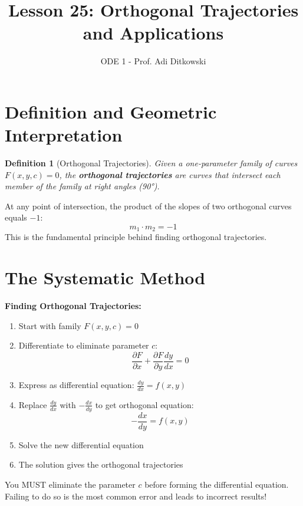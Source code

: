 \documentclass[12pt]{article}
\title{Lesson 25: Orthogonal Trajectories and Applications}
\author{ODE 1 - Prof. Adi Ditkowski}
\date{}
\newtheorem{definition}{Definition}
\begin{document}
\maketitle

\section{Definition and Geometric Interpretation}

\begin{definition}[Orthogonal Trajectories]
Given a one-parameter family of curves $F(x,y,c) = 0$, the \textbf{orthogonal trajectories} are curves that intersect each member of the family at right angles (90°).
\end{definition}

\begin{keypoint}
At any point of intersection, the product of the slopes of two orthogonal curves equals $-1$:
\[m_1 \cdot m_2 = -1\]
This is the fundamental principle behind finding orthogonal trajectories.
\end{keypoint}

\section{The Systematic Method}

\begin{algorithm}
\textbf{Finding Orthogonal Trajectories:}
\begin{enumerate}
    \item Start with family $F(x,y,c) = 0$
    \item Differentiate to eliminate parameter $c$:
    \[\frac{\partial F}{\partial x} + \frac{\partial F}{\partial y}\frac{dy}{dx} = 0\]
    \item Express as differential equation: $\frac{dy}{dx} = f(x,y)$
    \item Replace $\frac{dy}{dx}$ with $-\frac{dx}{dy}$ to get orthogonal equation:
    \[-\frac{dx}{dy} = f(x,y)\]
    \item Solve the new differential equation
    \item The solution gives the orthogonal trajectories
\end{enumerate}
\end{algorithm}

\begin{warning}
You MUST eliminate the parameter $c$ before forming the differential equation. Failing to do so is the most common error and leads to incorrect results!
\end{warning}
\end{document}
